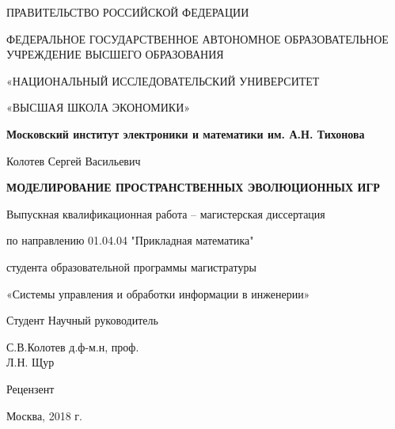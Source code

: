 \documentclass[a4paper]{article}
\begin{document}
	
	\begin{titlepage}
		\begin{center}
			
			ПРАВИТЕЛЬСТВО РОССИЙСКОЙ ФЕДЕРАЦИИ
			\vspace{0.75cm}
									
			ФЕДЕРАЛЬНОЕ ГОСУДАРСТВЕННОЕ АВТОНОМНОЕ 
			ОБРАЗОВАТЕЛЬНОЕ УЧРЕЖДЕНИЕ ВЫСШЕГО ОБРАЗОВАНИЯ
			
			«НАЦИОНАЛЬНЫЙ ИССЛЕДОВАТЕЛЬСКИЙ УНИВЕРСИТЕТ
			
			«ВЫСШАЯ ШКОЛА ЭКОНОМИКИ»\\
			\vspace{1cm}
			
			
			\textbf{Московский институт электроники и математики им. А.Н. Тихонова}
			
			\vspace{1cm}
			
			Колотев Сергей Васильевич
			\vspace{0.5cm}
			
			\textbf{МОДЕЛИРОВАНИЕ ПРОСТРАНСТВЕННЫХ ЭВОЛЮЦИОННЫХ ИГР}
			
			\vspace{1cm}
			Выпускная квалификационная работа – магистерская диссертация
			 
			по направлению 01.04.04 "Прикладная математика"
			
			студента образовательной программы магистратуры
			
			«Системы управления и обработки информации в инженерии»
			
			
		\end{center}
		\vspace{3cm}
			
		
		Студент \hfill Научный руководитель 
		
	 	С.В.Колотев 	  \hfill д.ф-м.н, проф. \\
		\null \hfill Л.Н. Щур
		 
		Рецензент
			
	
		\vfill
		\begin{center}
			Москва, 2018 г.
		\end{center}
	\end{titlepage}
\end{document}
